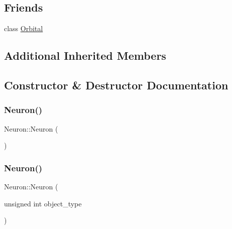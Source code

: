 \subsection*{Friends}
\begin{DoxyCompactItemize}
\item 
class \mbox{\hyperlink{classNeuron_a2ae3e36fe53bb2c406559e5a7c309027}{Orbital}}
\end{DoxyCompactItemize}
\subsection*{Additional Inherited Members}


\subsection{Constructor \& Destructor Documentation}
\mbox{\label{classNeuron_a823487d01615fadb8ac19a2768dd9d96}} 
\subsubsection{\texorpdfstring{Neuron()}{Neuron()}\hspace{0.1cm}{\footnotesize\ttfamily [1/4]}}
{\footnotesize\ttfamily Neuron\+::\+Neuron (\begin{DoxyParamCaption}{ }\end{DoxyParamCaption})\hspace{0.3cm}{\ttfamily [inline]}}

\mbox{\label{classNeuron_acbc433cac4f27aa7f4e05be26c336aa5}} 
\subsubsection{\texorpdfstring{Neuron()}{Neuron()}\hspace{0.1cm}{\footnotesize\ttfamily [2/4]}}
{\footnotesize\ttfamily Neuron\+::\+Neuron (\begin{DoxyParamCaption}\item[{unsigned int}]{object\+\_\+type }\end{DoxyParamCaption})\hspace{0.3cm}{\ttfamily [inline]}}

\mbox{\label{classNeuron_a4611499895417d44250c452d0fc719a6}} 
